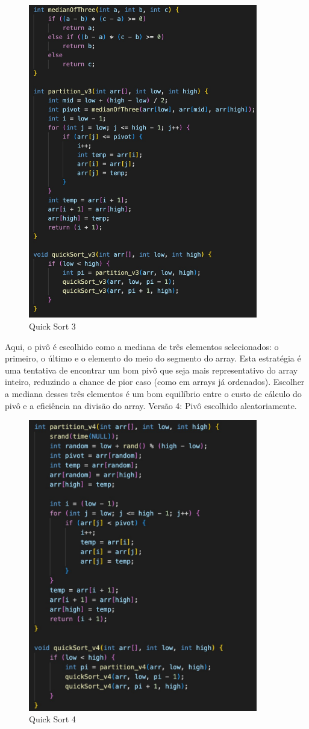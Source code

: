 \begin{figure}[H]
    \centering
    \includegraphics[width = 10cm]{Imagens/Quick Sort/quick3.jpeg}
    \caption{Quick Sort 3}
    \label{grafico_insert}
\end{figure}
Aqui, o pivô é escolhido como a mediana de três elementos selecionados: o primeiro, o último e o elemento do meio do segmento do array. Esta estratégia é uma tentativa de encontrar um bom pivô que seja mais representativo do array inteiro, reduzindo a chance de pior caso (como em arrays já ordenados). Escolher a mediana desses três elementos é um bom equilíbrio entre o custo de cálculo do pivô e a eficiência na divisão do array.
Versão 4: Pivô escolhido aleatoriamente.
\begin{figure}[H]
    \centering
    \includegraphics[width = 10cm]{Imagens/Quick Sort/quick4.jpeg}
    \caption{Quick Sort 4}
    \label{grafico_insert}
\end{figure}
